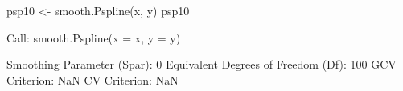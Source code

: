 \begin{Schunk}
\begin{Sinput}
 psp10 <- smooth.Pspline(x, y)
 psp10
\end{Sinput}
\begin{Soutput}
Call:
smooth.Pspline(x = x, y = y)

Smoothing Parameter (Spar): 0 
Equivalent Degrees of Freedom (Df): 100 
GCV Criterion: NaN 
CV  Criterion: NaN 
\end{Soutput}
\end{Schunk}

